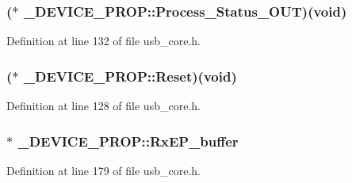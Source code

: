 \hypertarget{struct___d_e_v_i_c_e___p_r_o_p_abce960001781eb542f0fec560480a8c1}{
\subsubsection[{Process\-\_\-\-Status\-\_\-\-O\-U\-T}]{($\ast$ \-\_\-\-D\-E\-V\-I\-C\-E\-\_\-\-P\-R\-O\-P\-::\-Process\-\_\-\-Status\-\_\-\-O\-U\-T)({\bf void})}}\label{struct___d_e_v_i_c_e___p_r_o_p_abce960001781eb542f0fec560480a8c1}


Definition at line 132 of file usb\-\_\-core.\-h.

\hypertarget{struct___d_e_v_i_c_e___p_r_o_p_ae216d202b4b5d5874a79d84051c1fca7}{
\subsubsection[{Reset}]{($\ast$ \-\_\-\-D\-E\-V\-I\-C\-E\-\_\-\-P\-R\-O\-P\-::\-Reset)({\bf void})}}\label{struct___d_e_v_i_c_e___p_r_o_p_ae216d202b4b5d5874a79d84051c1fca7}


Definition at line 128 of file usb\-\_\-core.\-h.

\hypertarget{struct___d_e_v_i_c_e___p_r_o_p_ad71c9c4ae4ef449f22e77ae38fc28a21}{
\subsubsection[{Rx\-E\-P\-\_\-buffer}]{ $\ast$ \-\_\-\-D\-E\-V\-I\-C\-E\-\_\-\-P\-R\-O\-P\-::\-Rx\-E\-P\-\_\-buffer}}\label{struct___d_e_v_i_c_e___p_r_o_p_ad71c9c4ae4ef449f22e77ae38fc28a21}


Definition at line 179 of file usb\-\_\-core.\-h.




